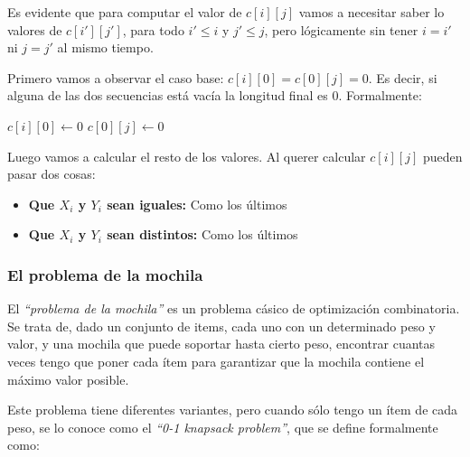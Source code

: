 Es evidente que para computar el valor de $c[i][j]$ vamos a necesitar saber lo valores de $c[i'][j']$, para todo $i' \leq i$ y $j' \leq j$, pero l\'ogicamente sin tener $i = i'$ ni $j = j'$ al mismo tiempo.

Primero vamos a observar el caso base: $c[i][0] = c[0][j] = 0$. Es decir, si alguna de las dos secuencias est\'a vac\'ia la longitud final es $0$. Formalmente:

\begin{algorithm}
\begin{algorithmic}[1]
  \State $c[i][0] \gets 0$
\EndFor
{}
  \State $c[0][j] \gets 0$
\EndFor
\end{algorithmic}
\end{algorithm}

Luego vamos a calcular el resto de los valores. Al querer calcular $c[i][j]$ pueden pasar dos cosas:

\begin{itemize}
\item \textbf{Que $X_i$ y $Y_i$ sean iguales:} Como los \'ultimos
\item \textbf{Que $X_i$ y $Y_i$ sean distintos:} Como los \'ultimos
\end{itemize}


\newpage
\subsubsection{El problema de la mochila}

El \emph{``problema de la mochila''} es un problema c\'asico de optimizaci\'on combinatoria. Se trata de, dado un conjunto de items, cada uno con un determinado peso y valor, y una mochila que puede soportar hasta cierto peso, encontrar cuantas veces tengo que poner cada \'item para garantizar que la mochila contiene el m\'aximo valor posible.

Este problema tiene diferentes variantes, pero cuando s\'olo tengo un \'item de cada peso, se lo conoce como el \emph{``0-1 knapsack problem''}, que se define formalmente como:

\noindent{}

